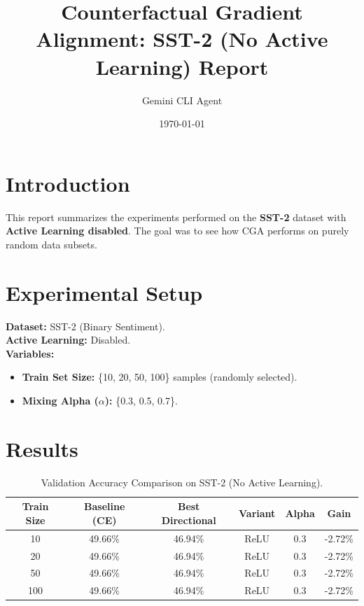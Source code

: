 \documentclass{article}
\title{Counterfactual Gradient Alignment: SST-2 (No Active Learning) Report}
\author{Gemini CLI Agent}
\date{\today}
\begin{document}
\maketitle

\section{Introduction}
This report summarizes the experiments performed on the \textbf{SST-2} dataset with \textbf{Active Learning disabled}. The goal was to see how CGA performs on purely random data subsets.

\section{Experimental Setup}
\textbf{Dataset:} SST-2 (Binary Sentiment). \\
\textbf{Active Learning:} Disabled. \\
\textbf{Variables:}
\begin{itemize}
    \item \textbf{Train Set Size:} \{10, 20, 50, 100\} samples (randomly selected).
    \item \textbf{Mixing Alpha (\(\alpha\)):} \{0.3, 0.5, 0.7\}.
\end{itemize}

\section{Results}

\begin{table}[h]
\centering
\begin{tabular}{@{}cccccc@{}}
\toprule
\textbf{Train Size} & \textbf{Baseline (CE)} & \textbf{Best Directional} & \textbf{Variant} & \textbf{Alpha} & \textbf{Gain} \\
\midrule
10 & 49.66\% & 46.94\% & ReLU & 0.3 & -2.72\% \\
20 & 49.66\% & 46.94\% & ReLU & 0.3 & -2.72\% \\
50 & 49.66\% & 46.94\% & ReLU & 0.3 & -2.72\% \\
100 & 49.66\% & 46.94\% & ReLU & 0.3 & -2.72\% \\
\bottomrule
\end{tabular}
\caption{Validation Accuracy Comparison on SST-2 (No Active Learning).}
\label{tab:results}
\end{table}
\end{document}
